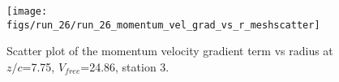 \begin{figure}[H]
\centering
\texttt{[image: figs/run\_26/run\_26\_momentum\_vel\_grad\_vs\_r\_meshscatter]}
\caption{Scatter plot of the momentum velocity gradient term vs radius at $z/c$=7.75, $V_{free}$=24.86, station 3.}
\label{fig:run_26_momentum_vel_grad_vs_r_meshscatter}
\end{figure}


